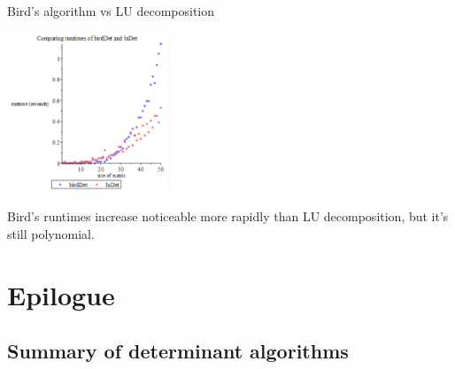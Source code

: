 \documentclass{beamer}
\begin{document}
\begin{frame}{Bird's algorithm vs LU decomposition}

    \begin{center}{}
        \includegraphics[height=180]{bird-lu}
    \end{center}

    Bird's runtimes increase noticeable more rapidly than LU decomposition,
    but it's still polynomial.

\end{frame}

\section{Epilogue}

\subsection{Summary of determinant algorithms}
\end{document}
